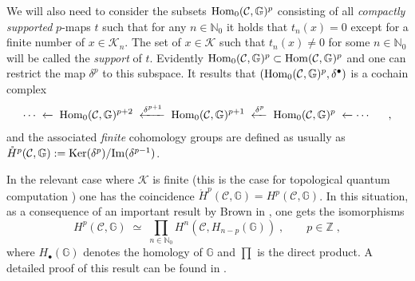 \documentclass[a4paper,12pt,twoside,reqno]{amsart}
\theoremstyle{plain}
\theoremstyle{definition}
\theoremstyle{remark}
\numberwithin{equation}{section}
\numberwithin{figure}{section}
\numberwithin{table}{section}
\newcommand{\f}[1]{\mathcal{#1}}
\newcommand{\n}[1]{\mathbb{#1}}
\begin{document}
	
	
	
	
	
	
	\medskip
	
	
	
	
	
	
	
	
	We will also need to consider the subsets  ${\rm Hom}_0(\f{C},\n{G})^p$ consisting of all \emph{compactly supported} $p$-maps $t$ such that for any $n\in\n{N}_0$ it holds that $t_n(x)=0$ except for a finite number of $x\in \f{K}_n$. The set of $x\in \f{K}$ such that $t_n(x)\neq0$ for some $n\in\n{N}_0$
	will be called the \emph{support} of $t$.
	Evidently ${\rm Hom}_0(\f{C},\n{G})^p\subset {\rm Hom}(\f{C},\n{G})^p$ and one can restrict the map $\delta^p$ to this subspace. It results that $({\rm Hom}_0(\f{C},\n{G})^p,\delta^\bullet)$ is a cochain complex 
	\begin{align}\label{finite cochain}
		\cdots\; \xleftarrow{}\; {\rm Hom}_0(\f{C},\n{G})^{p+2} \;\xleftarrow{\delta^{p+1}}\; {\rm Hom}_0(\f{C},\n{G})^{p+1}\;\xleftarrow{\delta^{p}} \;{\rm Hom}_0(\f{C},\n{G})^p \;\xleftarrow{} \cdots \;\quad \;,
	\end{align}
	and the associated \emph{finite} cohomology groups are defined as usually as  $\mathring{H}^{p}(\f{C},\n{G}):={\rm Ker}( \delta^p)/{\rm Im}( \delta^{p-1})$.
	
	
	
	
	
	
	
	
	
	
	
	\medskip
	
	
	
	
	
	
	
	
	In the relevant case where $\f{K}$ is finite (this is the case for topological quantum computation \cite{Pachos}) one has the coincidence $\mathring{H}^{p}(\f{C},\n{G})=H^p(\f{C},\n{G})$.
	In this situation, as a consequence of an important result by Brown in \cite{brown}, one gets the isomorphisms 
	\begin{equation}\label{mainthr}
		H^p(\f{C},\n{G})\;\simeq\; \prod_{n\in\n{N}_0}H^n(\f{C}, H_{n-p}(\n{G}))\;,\qquad p\in\n{Z}\;,
	\end{equation}
	where $H_{\bullet}(\n{G})$ denotes the homology of $\n{G}$ and $\prod$ is the direct product.
	A detailed proof of 
	this result can be found in  \cite[Appendix B]{dealmeida2017topological}.
	
	
	
\end{document}

